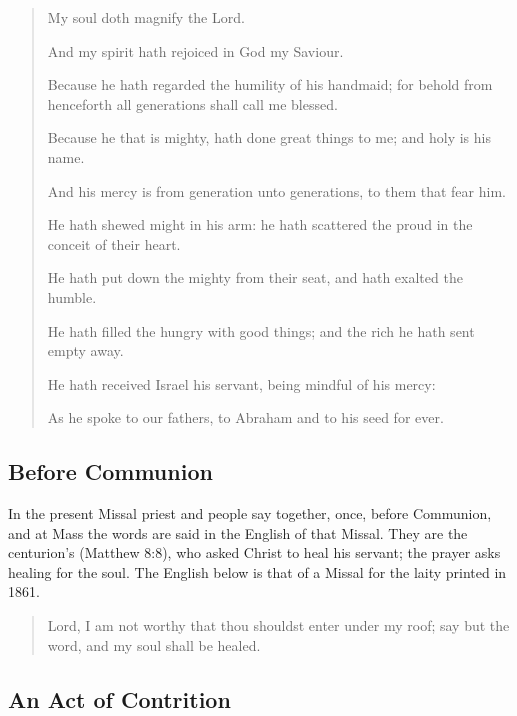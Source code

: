 \begin{quote}
My soul doth magnify the Lord.\par
And my spirit hath rejoiced in God my Saviour.\par
Because he hath regarded the humility of his handmaid; for behold from henceforth all generations shall call me blessed.\par
Because he that is mighty, hath done great things to me; and holy is his name.\par
And his mercy is from generation unto generations, to them that fear him.\par
He hath shewed might in his arm: he hath scattered the proud in the conceit of their heart.\par
He hath put down the mighty from their seat, and hath exalted the humble.\par
He hath filled the hungry with good things; and the rich he hath sent empty away.\par
He hath received Israel his servant, being mindful of his mercy:\par
As he spoke to our fathers, to Abraham and to his seed for ever.\par
\end{quote}

\subsection{Before Communion}

In the present Missal priest and people say 
together, once, before Communion, and at Mass the words are said in the English
of that Missal. They are the centurion's (Matthew 8:8), who asked Christ to
heal his servant; the prayer asks healing for the soul. The English below is
that of a Missal for the laity printed in 1861.

\begin{quote}
\par
\end{quote}

\begin{quote}
Lord, I am not worthy that thou shouldst enter under my roof; say but the word, and my soul shall be healed.\par
\end{quote}

\subsection{An Act of Contrition}

